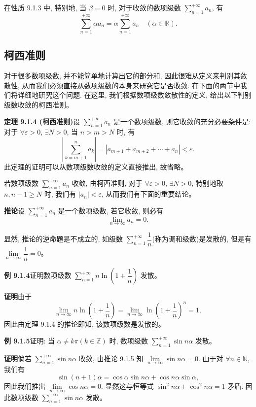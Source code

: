 \documentclass[UTF8,12pt,a4paper,fontset=fandol]{ctexart}
\begin{document}
在性质 9.1.3 中, 特别地, 当 $\beta=0$ 时, 对于收敛的数项级数 $\sum\limits_{n=1}^{+\infty}a_n$, 有
\[
  \sum_{n=1}^{+\infty}\alpha a_n=\alpha\sum_{n=1}^{+\infty}a_n\quad(\alpha\in\mathbb R).
\]

\subsection{柯西准则}

对于很多数项级数, 并不能简单地计算出它的部分和, 因此很难从定义来判别其敛散性, 从而我们必须直接从数项级数的本身来研究它是否收敛. 在下面的两节中我们将详细地研究这个问题. 在这里, 我们根据数项级数敛散性的定义, 给出以下判别级数收敛的柯西准则。

\noindent\textbf{定理 9.1.4 (柯西准则)}\quad 设 $\sum\limits_{n=1}^{+\infty}a_n$ 是一个数项级数, 则它收敛的充分必要条件是: 对于 $\forall\varepsilon>0$, $\exists N>0$, 当 $n>m>N$ 时, 有
\[
  \left|\sum_{k=m+1}^n a_k\right|
  =|a_{m+1}+a_{m+2}+\cdots+a_n|<\varepsilon.
\]
此定理的证明可以从数项级数收敛的定义直接推出, 故省略。

若数项级数 $\sum\limits_{n=1}^{+\infty}a_n$ 收敛, 由柯西准则, 对于 $\forall\varepsilon>0$, $\exists N>0$, 特别地取 $n,n-1\geq N$ 时, 我们有 $|a_n|<\varepsilon$, 从而我们有下面的重要结论。

\noindent\textbf{推论}\quad 设 $\sum\limits_{n=1}^{+\infty}a_n$ 是一个数项级数, 若它收敛, 则必有
\[
  \lim_{n\to\infty}a_n=0.
\]

显然, 推论的逆命题是不成立的, 如级数 $\sum\limits_{n=1}^{+\infty}\dfrac1n$(称为调和级数)是发散的, 但是有 $\lim\limits_{n\to\infty}\dfrac1n=0$。

\noindent\textbf{例 9.1.4}\quad 证明数项级数 $\sum\limits_{n=1}^{+\infty}n\ln\left(1+\dfrac1n\right)$ 发散。

\noindent\textbf{证明}\quad 由于
\[
  \lim_{n\to\infty}n\ln\left(1+\frac1n\right)
  =\lim_{n\to\infty}\ln\left(1+\frac1n\right)^n=1,
\]
因此由定理 9.1.4 的推论即知, 该数项级数是发散的。

\noindent\textbf{例 9.1.5}\quad 证明: 当 $\alpha\neq k\pi(k\in\mathbb Z)$ 时, 数项级数 $\sum\limits_{n=1}^{+\infty}\sin n\alpha$ 发散。

\noindent\textbf{证明}\quad 倘若 $\sum\limits_{n=1}^{+\infty}\sin n\alpha$ 收敛, 由推论 9.1.5 知 $\lim\limits_{n\to\infty}\sin n\alpha=0$. 由于对 $\forall n\in\mathbb N$, 我们有
\[
  \sin(n+1)\alpha=\cos\alpha\sin n\alpha+\cos n\alpha\sin\alpha,
\]
因此我们推出 $\lim\limits_{n\to\infty}\cos n\alpha=0$. 显然这与恒等式 $\sin^2n\alpha+\cos^2n\alpha=1$ 矛盾. 因此数项级数 $\sum\limits_{n=1}^{+\infty}\sin n\alpha$ 发散。
\end{document}
